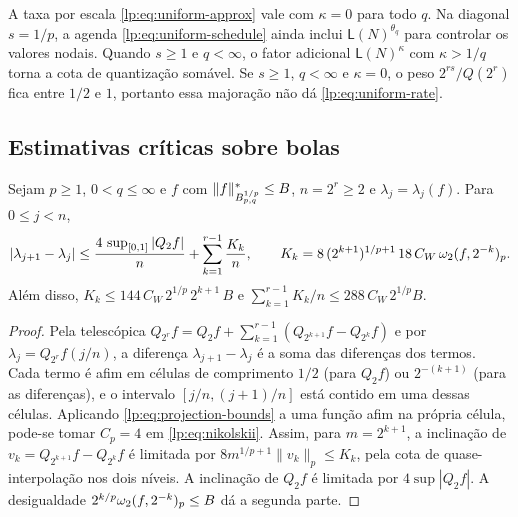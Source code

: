 \documentclass[12pt,a4paper]{article}
\begin{document}
\begin{observacao}
\label{lp:obs:uniform-q}
A taxa por escala \eqref{lp:eq:uniform-approx} vale com $\kappa=0$ para todo $q$. Na diagonal $s=1/p$, a agenda \eqref{lp:eq:uniform-schedule} ainda inclui $\mathsf L(N)^{\theta_q}$ para controlar os valores nodais. Quando $s\ge1$ e $q<\infty$, o fator adicional $\mathsf L(N)^\kappa$ com $\kappa>1/q$ torna a cota de quantização somável. Se $s\ge1$, $q<\infty$ e $\kappa=0$, o peso $2^{rs}/Q(2^r)$ fica entre $1/2$ e $1$, portanto essa majoração não dá \eqref{lp:eq:uniform-rate}.
\end{observacao}

\subsection{Estimativas críticas sobre bolas}

\begin{lema}
\label{lp:lem:critical-jump}
Sejam $p\ge1$, $0<q\le\infty$ e $f$ com $\|f\|^*_{B^{1/p}_{p,q}}\le B$, $n=2^r\ge2$ e $\lambda_j=\lambda_j(f)$. Para $0\le j<n$,
\begin{equation}
 |\lambda_{j+1}-\lambda_j|\le\frac{4\,\sup_{[0,1]}|Q_2f|}{n}+\sum_{k=1}^{r-1}\frac{K_k}{n},
 \qquad K_k=8\,(2^{k+1})^{1/p+1}\,18\,C_W\,\omega_2(f,2^{-k})_{p}.
 \label{lp:eq:critical-jump}
\end{equation}
Além disso, $K_k\le 144\,C_W\,2^{1/p}\,2^{k+1}\,B$ e $\sum_{k=1}^{r-1}K_k/n\le 288\,C_W\,2^{1/p}B$.
\end{lema}

\begin{proof}
Pela telescópica $Q_{2^r}f=Q_2f+\sum_{k=1}^{r-1}(Q_{2^{k+1}}f-Q_{2^k}f)$ e por $\lambda_j=Q_{2^r}f(j/n)$, a diferença $\lambda_{j+1}-\lambda_j$ é a soma das diferenças dos termos. Cada termo é afim em células de comprimento $1/2$ (para $Q_2f$) ou $2^{-(k+1)}$ (para as diferenças), e o intervalo $[j/n,(j+1)/n]$ está contido em uma dessas células. Aplicando \eqref{lp:eq:projection-bounds} a uma função afim na própria célula, pode-se tomar $C_p=4$ em \eqref{lp:eq:nikolskii}. Assim, para $m=2^{k+1}$, a inclinação de $v_k=Q_{2^{k+1}}f-Q_{2^k}f$ é limitada por $8m^{1/p+1}\|v_k\|_p\le K_k$, pela cota de quase-interpolação nos dois níveis. A inclinação de $Q_2f$ é limitada por $4\sup|Q_2f|$. A desigualdade $2^{k/p}\omega_2(f,2^{-k})_{p}\le B$ dá a segunda parte.
\end{proof}
\end{document}
